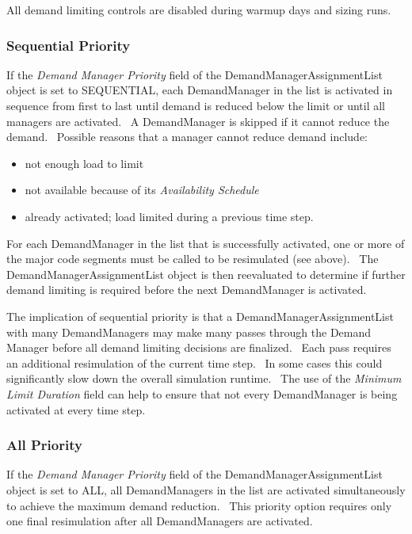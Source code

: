 All demand limiting controls are disabled during warmup days and sizing runs.

\subsubsection{Sequential Priority}\label{sequential-priority}

If the \emph{Demand Manager Priority} field of the DemandManagerAssignmentList object is set to SEQUENTIAL, each DemandManager in the list is activated in sequence from first to last until demand is reduced below the limit or until all managers are activated.~ A DemandManager is skipped if it cannot reduce the demand.~ Possible reasons that a manager cannot reduce demand include:

\begin{itemize}
\item
  not enough load to limit
\item
  not available because of its \emph{Availability Schedule}
\item
  already activated; load limited during a previous time step.
\end{itemize}

For each DemandManager in the list that is successfully activated, one or more of the major code segments must be called to be resimulated (see above).~ The DemandManagerAssignmentList object is then reevaluated to determine if further demand limiting is required before the next DemandManager is activated.

The implication of sequential priority is that a DemandManagerAssignmentList with many DemandManagers may make many passes through the Demand Manager before all demand limiting decisions are finalized.~ Each pass requires an additional resimulation of the current time step.~ In some cases this could significantly slow down the overall simulation runtime.~ The use of the \emph{Minimum Limit Duration} field can help to ensure that not every DemandManager is being activated at every time step.

\subsubsection{All Priority}\label{all-priority}

If the \emph{Demand Manager Priority} field of the DemandManagerAssignmentList object is set to ALL, all DemandManagers in the list are activated simultaneously to achieve the maximum demand reduction.~ This priority option requires only one final resimulation after all DemandManagers are activated.
